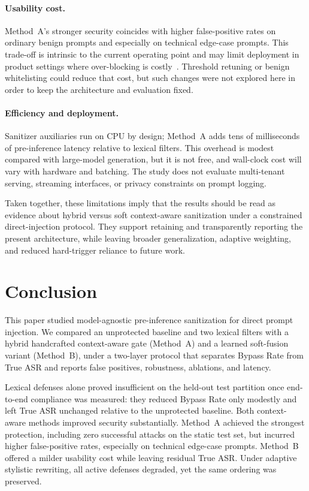 ﻿\documentclass[10pt]{article}
\begin{document}
\paragraph{Usability cost.}
Method~A's stronger security coincides with higher false-positive rates on ordinary benign prompts and especially on technical edge-case prompts.
This trade-off is intrinsic to the current operating point and may limit deployment in product settings where over-blocking is costly~\cite{bair2025prompt,kholkar2025capture}.
Threshold retuning or benign whitelisting could reduce that cost, but such changes were not explored here in order to keep the architecture and evaluation fixed.

\paragraph{Efficiency and deployment.}
Sanitizer auxiliaries run on CPU by design; Method~A adds tens of milliseconds of pre-inference latency relative to lexical filters.
This overhead is modest compared with large-model generation, but it is not free, and wall-clock cost will vary with hardware and batching.
The study does not evaluate multi-tenant serving, streaming interfaces, or privacy constraints on prompt logging.

Taken together, these limitations imply that the results should be read as evidence about hybrid versus soft context-aware sanitization under a constrained direct-injection protocol.
They support retaining and transparently reporting the present architecture, while leaving broader generalization, adaptive weighting, and reduced hard-trigger reliance to future work.


\section{Conclusion}
\label{sec:conclusion}

This paper studied model-agnostic pre-inference sanitization for direct prompt injection.
We compared an unprotected baseline and two lexical filters with a hybrid handcrafted context-aware gate (Method~A) and a learned soft-fusion variant (Method~B), under a two-layer protocol that separates Bypass Rate from True ASR and reports false positives, robustness, ablations, and latency.

Lexical defenses alone proved insufficient on the held-out test partition once end-to-end compliance was measured: they reduced Bypass Rate only modestly and left True ASR unchanged relative to the unprotected baseline.
Both context-aware methods improved security substantially.
Method~A achieved the strongest protection, including zero successful attacks on the static test set, but incurred higher false-positive rates, especially on technical edge-case prompts.
Method~B offered a milder usability cost while leaving residual True ASR.
Under adaptive stylistic rewriting, all active defenses degraded, yet the same ordering was preserved.
\end{document}
